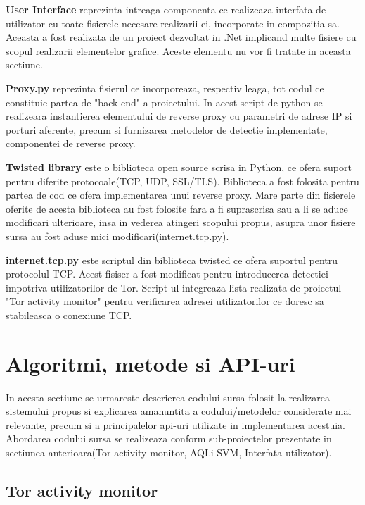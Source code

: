 \textbf{User Interface} reprezinta intreaga componenta ce realizeaza interfata de utilizator cu toate fisierele necesare realizarii ei, incorporate in compozitia sa. Aceasta a fost realizata de un proiect dezvoltat in .Net implicand multe fisiere cu scopul realizarii elementelor grafice. Aceste elementu nu vor fi tratate in aceasta sectiune.

\textbf{Proxy.py} reprezinta fisierul ce incorporeaza, respectiv leaga, tot codul ce constituie partea de "back end" a proiectului. In acest script de python se realizeara instantierea elementului de reverse proxy cu parametri de adrese IP si porturi aferente, precum si furnizarea metodelor de detectie implementate, componentei de reverse proxy.

\textbf{Twisted library} este o biblioteca open source scrisa in Python, ce ofera suport pentru diferite protocoale(TCP, UDP, SSL/TLS). Biblioteca a fost folosita pentru partea de cod ce ofera implementarea unui reverse proxy. Mare parte din fisierele oferite de acesta biblioteca au fost folosite fara a fi suprascrisa sau a li se aduce modificari ulterioare, insa in vederea atingeri scopului propus, asupra unor fisiere sursa au fost aduse mici modificari(internet.tcp.py).

\textbf{internet.tcp.py} este scriptul din biblioteca twisted ce ofera suportul pentru protocolul TCP. Acest fisiser a fost modificat pentru introducerea detectiei impotriva utilizatorilor de Tor. Script-ul integreaza lista realizata de proiectul "Tor activity monitor" pentru verificarea adresei utilizatorilor ce doresc sa stabileasca o conexiune TCP.




\section{Algoritmi, metode si API-uri}

In acesta sectiune se urmareste descrierea codului sursa folosit la realizarea sistemului propus si explicarea amanuntita a codului/metodelor considerate mai relevante, precum si a principalelor api-uri utilizate in implementarea acestuia. Abordarea codului sursa se realizeaza conform sub-proiectelor prezentate in sectiunea anterioara(Tor activity monitor, AQLi SVM, Interfata utilizator).

\subsection{Tor activity monitor}

